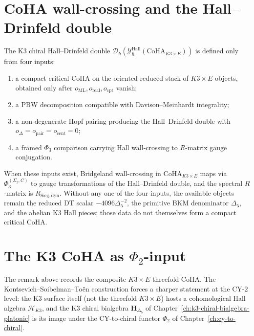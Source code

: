 \section{CoHA wall-crossing and the Hall--Drinfeld double}
\label{sec:cwc-hall-drinfeld-double}

\begin{remark}
\label{rem:cwc-k3xe-hall-drinfeld}
The K3 chiral Hall--Drinfeld double
$\mathcal{D}_\hbar(\mathcal{Y}^{\mathrm{Hall}}_\hbar(\mathrm{CoHA}_{K3 \times E}))$
is defined only from four inputs:
\begin{enumerate}[label=\textup{(\roman*)}]
\item a compact critical CoHA on the oriented reduced stack of
$K3\times E$ objects, obtained only after
$o_{\mathrm{ML}},o_{\mathrm{real}},o_{\mathrm{cpt}}$ vanish;
\item a PBW decomposition compatible with Davison--Meinhardt integrality;
\item a non-degenerate Hopf pairing producing the Hall--Drinfeld double
with $o_\Delta=o_{\mathrm{pair}}=o_{\mathrm{cent}}=0$;
\item a framed $\Phi_3$ comparison carrying Hall wall-crossing to
$R$-matrix gauge conjugation.
\end{enumerate}
When these inputs exist, Bridgeland wall-crossing in
$\mathrm{CoHA}_{K3 \times E}$ maps via $\Phi_3^{(\Sigma_2, C)}$ to gauge transformations
of the Hall--Drinfeld double, and the spectral $R$-matrix is
$R_{\mathrm{Sieg,dyn}}$. Without any one of the four inputs, the
available objects remain the reduced DT scalar
$-4096\Delta_5^{-2}$, the primitive BKM denominator $\Delta_5$, and the
abelian K3 Hall pieces; those data do not themselves form a compact
critical CoHA.
\end{remark}

\section{The K3 CoHA as \texorpdfstring{$\Phi_2$}{Phi-2}-input}
\label{sec:cwc-k3-coha-phi-input}

The remark above records the composite $K3\times E$ threefold CoHA\@.
The Kontsevich--Soibelman--To\"en construction forces a sharper statement at
the CY-$2$ level: the K3 surface itself (not the threefold $K3\times E$)
hosts a cohomological Hall algebra $\mathcal{H}_{K3}$, and the K3 chiral
bialgebra $\mathbf{H}_{\Delta_5}$ of
Chapter~\ref{ch:k3-chiral-bialgebra-platonic} is its image under the
CY-to-chiral functor $\Phi_2$ of Chapter~\ref{ch:cy-to-chiral}.

